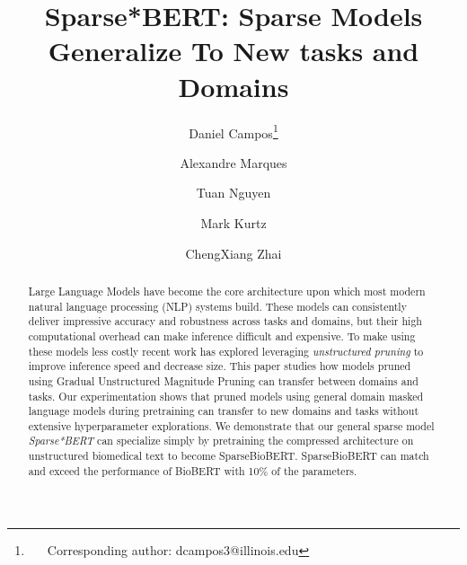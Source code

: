 \documentclass[10pt]{article}
\title{Sparse*BERT: Sparse Models Generalize To New tasks and Domains }
\author[1,2]{Daniel Campos\thanks{~~~Corresponding author: dcampos3@illinois.edu}}
\author[2]{Alexandre Marques}
\author[2]{Tuan Nguyen}
\author[2]{Mark Kurtz}
\author[1]{ChengXiang Zhai}
\affil[1]{Department of Computer Science, the University of Illinois Urbana-Champaign}
\affil[2]{Neural Magic Inc.}
\begin{document}
\maketitle
\begin{abstract}
Large Language Models have become the core architecture upon which most modern natural language processing (NLP) systems build. These models can consistently deliver impressive accuracy and robustness across tasks and domains, but their high computational overhead can make inference difficult and expensive. To make using these models less costly recent work has explored leveraging \textit{unstructured pruning} to improve inference speed and decrease size. This paper studies how models pruned using Gradual Unstructured Magnitude Pruning can transfer between domains and tasks. Our experimentation shows that pruned models using general domain masked language models during pretraining can transfer to new domains and tasks without extensive hyperparameter explorations. We demonstrate that our general sparse model \textit{Sparse*BERT} can specialize simply by pretraining the compressed architecture on unstructured biomedical text to become SparseBioBERT. SparseBioBERT can match and exceed the performance of BioBERT with 10\% of the parameters.
\end{abstract}
\end{document}

